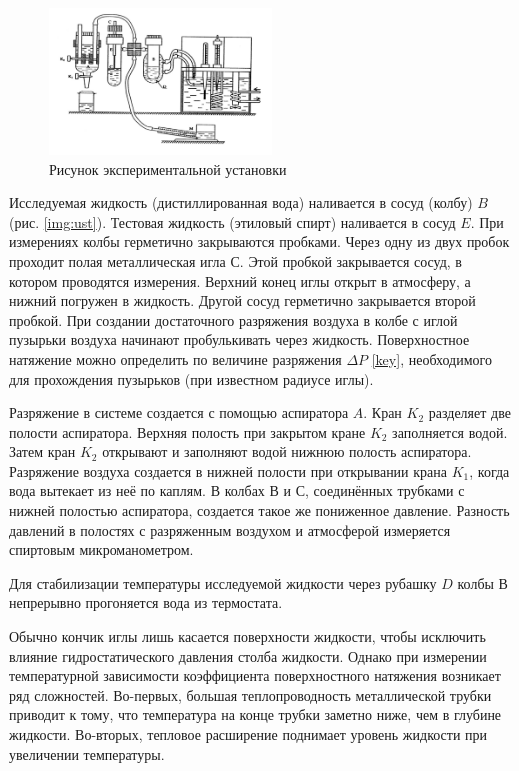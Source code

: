\documentclass[a4paper,12pt]{article}
\theoremstyle{definition}
\begin{document}
	\begin{figure}
		\begin{center}
			\includegraphics[width=5.9cm]{fac}
			\caption{Рисунок экспериментальной установки}
			\label{img:ust}
		\end{center}
	\end{figure}
	
	Исследуемая жидкость (дистиллированная вода) наливается в сосуд (колбу) $ B $ (рис. \eqref{img:ust}). Тестовая жидкость  (этиловый спирт) наливается  в сосуд $ E $.  При измерениях  колбы герметично закрываются  пробками. Через одну из двух пробок  проходит полая металлическая игла $ С $. Этой пробкой закрывается сосуд, в котором  проводятся измерения. Верхний конец иглы открыт в атмосферу, а нижний погружен в жидкость. Другой сосуд герметично закрывается второй пробкой. При создании достаточного  разряжения воздуха в колбе с иглой пузырьки воздуха начинают пробулькивать через жидкость. Поверхностное натяжение можно определить по величине разряжения $ \Delta P $ \eqref{key}, необходимого для прохождения пузырьков (при известном радиусе иглы).
	
	Разряжение в системе создается с помощью аспиратора $ A $. Кран $ K_2 $ разделяет две полости аспиратора. Верхняя полость при закрытом кране $ K_2 $ заполняется водой. Затем кран $ K_2 $ открывают и заполняют водой  нижнюю полость  аспиратора.  Разряжение воздуха создается в нижней полости  при открывании крана $ K_1 $, когда  вода вытекает из неё по каплям. В колбах $ В $ и $ С $, соединённых трубками с нижней полостью аспиратора, создается такое же пониженное давление. Разность давлений в полостях с разряженным воздухом и атмосферой измеряется спиртовым микроманометром. 
	
	Для стабилизации температуры исследуемой жидкости через рубашку $ D $ колбы $ В $ непрерывно прогоняется вода из термостата.
	
	Обычно кончик иглы лишь касается поверхности жидкости, чтобы исключить влияние гидростатического давления столба жидкости. Однако при измерении температурной зависимости коэффициента поверхностного натяжения возникает ряд сложностей. Во-первых, большая теплопроводность металлической трубки приводит к тому, что температура на конце трубки заметно ниже, чем в глубине жидкости. Во-вторых, тепловое расширение поднимает уровень жидкости при увеличении температуры.
	
\end{document}
